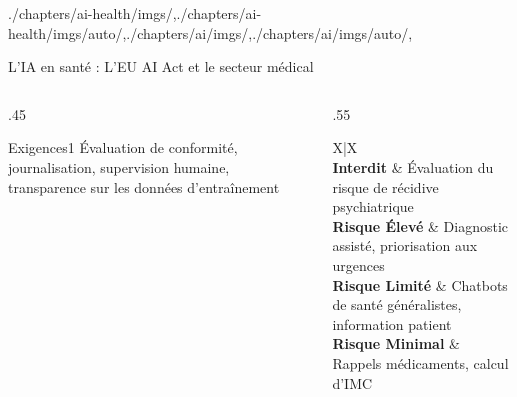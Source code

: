 \begin{graphicspathcontext}{{./chapters/ai-health/imgs/},{./chapters/ai-health/imgs/auto/},{./chapters/ai/imgs/},{./chapters/ai/imgs/auto/},\old}
\begin{frame}[t]{{L'IA en santé :} L'EU AI Act et le secteur médical}
	\begin{columns}
		\begin{column}{.45\linewidth}
			\vspace{.3cm}
			\begin{rightanchorblock}{Exigences}{1}
			Évaluation de conformité, journalisation, supervision humaine, transparence sur les données d'entraînement
			\end{rightanchorblock}
		\end{column}
		\begin{column}{.55\linewidth}
			\begin{stabularx}{X|X}
			 \\
			\textbf{Interdit} & Évaluation du risque de récidive psychiatrique \\
			\hline
			\textbf{Risque Élevé} & Diagnostic assisté, priorisation aux urgences \\
			\hline
			\textbf{Risque Limité} & Chatbots de santé généralistes, information patient \\
			\hline
			\textbf{Risque Minimal} & Rappels médicaments, calcul d'IMC \\
			\end{stabularx}
		\end{column}
	\end{columns}
\end{frame}

\end{graphicspathcontext}

\endinput
